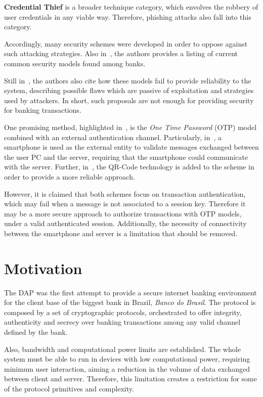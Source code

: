 \textbf{Credential Thief} is a broader technique category, which envolves the robbery of user credentials in any viable way. Therefore, phishing attacks also fall into this category.

Accordingly, many security schemes were developed in order to oppose against such attacking strategies. Also in~\cite{Peotta2011, Adham2013}, the authors provides a listing of current common security models found among banks.

Still in~\cite{Peotta2011, Adham2013}, the authors also cite how these models fail to provide reliability to the system, describing possible flaws which are passive of exploitation and strategies used by attackers. In short, such proposals are not enough for providing security for banking transactions.

One promising method, highlighted in~\cite[p.61]{Peotta2012}, is the \textit{One Time Password} (OTP) model combined with an external authentication channel. Particularly, in~\cite{Starnberger2009}, a smartphone is used as the external entity to validate messages exchanged between the user PC and the server, requiring that the smartphone could communicate with the server. Further, in~\cite{LeeHyunLim2010}, the QR-Code technology is added to the scheme in order to provide a more reliable approach.

However, it is claimed that both schemes focus on transaction authentication, which may fail when a message is not associated to a session key. Therefore it may be a more secure approach to authorize transactions with OTP models, under a valid authenticated session. Additionally, the necessity of connectivity between the smartphone and server is a limitation that should be removed.





\section{Motivation}
The DAP was the first attempt to provide a secure internet banking environment for the client base of the biggest bank in Brazil, \textit{Banco do Brasil}. The protocol is composed by a set of cryptographic protocols, orchestrated to offer integrity, authenticity and secrecy over banking transactions among any valid channel defined by the bank.

Also, bandwidth and computational power limits are established. The whole system must be able to run in devices with low computational power, requiring minimum user interaction, aiming a reduction in the volume of data exchanged between client and server. Therefore, this limitation creates a restriction for some of the protocol primitives and complexity.

